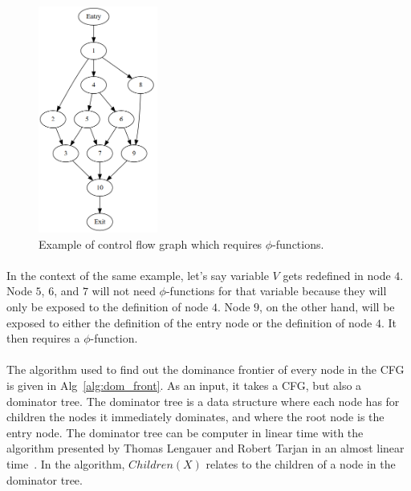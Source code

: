 \begin{figure}[!htb]
	\centering
	\includegraphics[width=0.35\textwidth]{contribution/graph_example.png}
	\caption{Example of control flow graph which requires $\phi$-functions.}
	\label{fig:control_flow_graph}
\end{figure}

\paragraph{}
In the context of the same example, let's say variable $V$ gets redefined in node $4$. Node $5$, $6$, and $7$ will not need $\phi$-functions for that variable because they will only be exposed to the definition of node $4$. Node $9$, on the other hand, will be exposed to either the definition of the entry node or the definition of node $4$. It then requires a $\phi$-function. 

\paragraph{}
The algorithm used to find out the dominance frontier of every node in the CFG is given in Alg~\ref{alg:dom_front}. As an input, it takes a CFG, but also a dominator tree. The dominator tree is a data structure where each node has for children the nodes it immediately dominates, and where the root node is the entry node. The dominator tree can be computer in linear time with the algorithm presented by Thomas Lengauer and Robert Tarjan in an almost linear time~\cite{lengauer1979fast}. In the algorithm, $Children(X)$ relates to the children of a node in the dominator tree.

